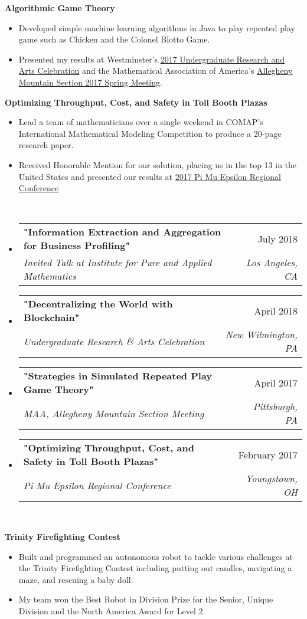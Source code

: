 \documentclass[letterpaper,11pt]{article}
\makeatletter
\newcommand{\resitem}[1]{\item #1 \vspace{-2pt}}
\newcommand{\resheading}[1]{{\large \colorbox{mypurple}{\begin{minipage}{\textwidth}{\textbf{#1 \vphantom{p\^{E}}}}\end{minipage}}}}
\newcommand{\ressubheading}[4]{
	\begin{tabular*}{7.0in}{l@{\extracolsep{\fill}}r}
		\textbf{#1} & #2 \\
		\textit{#3} & \textit{#4} \\
	\end{tabular*}\vspace{-6pt}}
\makeatother
\begin{document}
		\textbf{Algorithmic Game Theory}
		\begin{itemize}
			\resitem{Developed simple machine learning algorithms in Java to play repeated play game such as Chicken and the Colonel Blotto Game.}
			\resitem{Presented my results at Westminster's \href{https://alexandermichels.github.io/docs/2017-urac-schedule.pdf}{2017 Undergraduate Research and Arts Celebration} and the Mathematical Association of America's \href{https://alexandermichels.github.io/docs/MAA2017Abstracts.pdf}{Allegheny Mountain Section 2017 Spring Meeting}.}
		\end{itemize}
	
		\textbf{Optimizing Throughput, Cost, and Safety in Toll Booth Plazas}
		\begin{itemize}
			\resitem{Lead a team of mathematicians over a single weekend in COMAP's International Mathematical Modeling Competition to produce a 20-page research paper.}
			\resitem{Received Honorable Mention for our solution, placing us in the top 13 in the United States and presented our results at \href{https://alexandermichels.github.io/docs/PME2017Program.pdf}{2017 Pi Mu Epsilon Regional Conference}}
		\end{itemize}
		
		\resheading{\textcolor{white}{Presentations}}
		\begin{itemize}
				\item
				\ressubheading{"Information Extraction and Aggregation for Business Profiling"}{July 2018}{Invited Talk at Institute for Pure and Applied Mathematics}{Los Angeles, CA}
				\item
				\ressubheading{"Decentralizing the World with Blockchain"}{April 2018}{Undergraduate Research \& Arts Celebration}{New Wilmington, PA}
				\item
				\ressubheading{"Strategies in Simulated Repeated Play Game Theory"}{April 2017}{MAA, Allegheny Mountain Section Meeting}{Pittsburgh, PA}
				\item
				\ressubheading{"Optimizing Throughput, Cost, and Safety in Toll Booth Plazas"}{February 2017}{Pi Mu Epsilon Regional Conference}{Youngstown, OH}
					
		\end{itemize}
	
	\resheading{\textcolor{white}{Projects}}
	
			\vspace{0.1in}
	
	\textbf{Trinity Firefighting Contest}
	\begin{itemize}
		\resitem{Built and programmed an autonomous robot to tackle various challenges at the Trinity Firefighting Contest including putting out candles, navigating a maze, and rescuing a baby doll.}
		\resitem{My team won the Best Robot in Division Prize for the Senior, Unique Division and the North America Award for Level 2.}
	\end{itemize}
	
\end{document}
